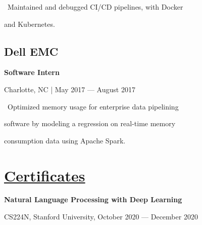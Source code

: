 \documentclass{article}
\begin{document}
\begin{minipage}[t]{0.45\textwidth\hspace{0in}}
\begin{minipage}[t]{3.75in\textwidth\hspace{0in}}
            \vspace{0.3em}
            \hspace{1em}\textasteriskcentered \, \mdseries\textrm{Maintained and debugged CI/CD pipelines, with Docker}

            \hspace{1.6em} and Kubernetes.
        \end{minipage}

        \vspace{0.3em}
        \subsection{Dell EMC}
        \vspace{-0.5em}\hspace{0.1em}
        \mdseries\bfseries{Software Intern}
        \vspace{0.1em}
        
        \hspace{0.5em}\mdseries\textrm{Charlotte, NC | May 2017 — August 2017}

        \vspace{-0.4em}
        \begin{minipage}[t]{3.75in\textwidth\hspace{0in}}
            \vspace{0.1em}
            \hspace{1em}\textasteriskcentered \, \mdseries\textrm{Optimized memory usage for enterprise data pipelining} 
            
            \hspace{1.6em} software by modeling a regression on real-time memory 
            
            \hspace{1.6em} consumption data using Apache Spark.
        \end{minipage}

        \section{\underline{Certificates}}
        \begin{minipage}[t]{3.75in\textwidth\hspace{0in}}            
            \mdseries\bfseries{Natural Language Processing with Deep Learning}
            
            \small\mdseries\textrm {CS224N, Stanford University, October 2020 — December 2020}
            

\end{minipage}
\end{minipage}
\end{document}
